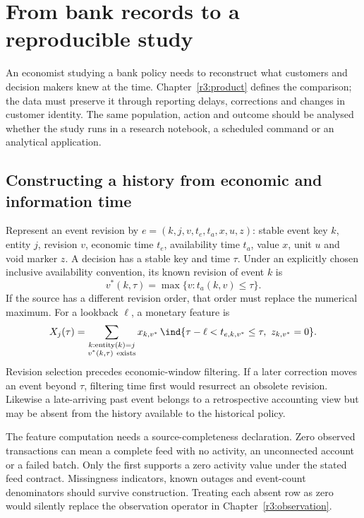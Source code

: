 \chapter{From bank records to a reproducible study}
\label{r3:construction}

An economist studying a bank policy needs to reconstruct what customers
and decision makers knew at the time. Chapter~\ref{r3:product} defines the
comparison; the data must preserve it through reporting delays, corrections
and changes in customer identity. The same population, action and outcome
should be analysed whether the study runs in a research notebook, a scheduled
command or an analytical application.

\section{Constructing a history from economic and information time}
\label{r3:history-construction}

Represent an event revision by
$e=(k,j,v,t_e,t_a,x,u,z)$: stable event key $k$, entity $j$, revision $v$,
economic time $t_e$, availability time $t_a$, value $x$, unit $u$ and
void marker $z$. A decision has a stable key and time $\tau$.
Under an explicitly chosen inclusive availability convention, its known
revision of event $k$ is
\[
 v^*(k,\tau)=\max\{v:t_a(k,v)\le\tau\}.
\]
If the source has a different revision order, that order must replace
the numerical maximum. For a lookback $\ell$, a monetary feature is
\begin{equation}
 X_j(\tau)=
 \sum_{\substack{k:\operatorname{entity}(k)=j\\v^*(k,\tau)\ {\rm exists}}}
 x_{k,v^*}\,
 \ind\{\tau-\ell<t_{e,k,v^*}\le\tau,\ z_{k,v^*}=0\}.
 \label{r3:revision-feature}
\end{equation}
Revision selection precedes economic-window filtering. If a later
correction moves an event beyond $\tau$, filtering time first would
resurrect an obsolete revision. Likewise a late-arriving past event
belongs to a retrospective accounting view but may be absent from the
history available to the historical policy.

The feature computation needs a source-completeness declaration. Zero
observed transactions can mean a complete feed with no activity, an
unconnected account or a failed batch. Only the first supports a zero
activity value under the stated feed contract. Missingness indicators,
known outages and event-count denominators should survive construction.
Treating each absent row as zero would silently replace the observation
operator in Chapter~\ref{r3:observation}.


